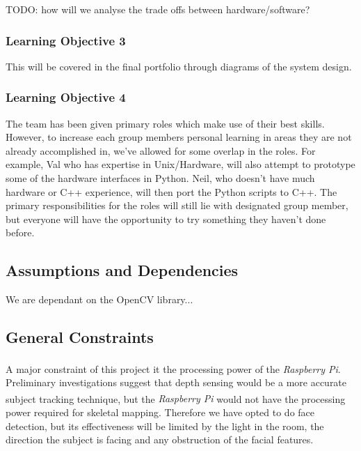 \documentclass[11pt,a4paper,titlepage]{report}
\newcommand{\rpi}{\textit{Raspberry Pi\textsuperscript{\textregistered}}}
\begin{document}
{\color{red} TODO: how will we analyse the trade offs between hardware/software?}


\subsubsection{Learning Objective 3}

This will be covered in the final portfolio through diagrams of the system design.

\subsubsection{Learning Objective 4}


The team has been given primary roles which make use of their best skills. However, to increase each group members personal learning in areas they are not already accomplished in, we've allowed for some overlap in the roles. For example, Val who has expertise in Unix/Hardware, will also attempt to prototype some of the hardware interfaces in Python. Neil, who doesn't have much hardware or C++ experience, will then port the Python scripts to C++. The primary responsibilities for the roles will still lie with designated group member, but everyone will have the opportunity to try something they haven't done before.


\subsection{Assumptions and Dependencies}

{\color{red} We are dependant on the OpenCV library...}

\subsection{General Constraints}

A major constraint of this project it the processing power of the \rpi. Preliminary investigations suggest that depth sensing would be a more accurate subject tracking technique, but the \rpi\xspace would not have the processing power required for skeletal mapping. Therefore we have opted to do face detection, but its effectiveness will be limited by the light in the room, the direction the subject is facing and any obstruction of the facial features.
\end{document}
